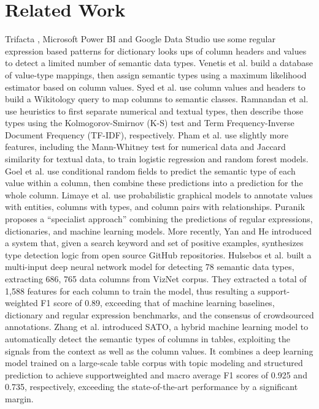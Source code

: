 \documentclass{article}
\begin{document}
\section{Related Work}
Trifacta \cite{Trifacta}, Microsoft Power BI \cite{powerbi} and Google Data Studio \cite{google}  use some regular expression based patterns for dictionary looks ups of column headers and values to detect a limited number of semantic data types. Venetis et al. \cite{Venetis} build a database of value-type mappings, then assign semantic types using a maximum likelihood estimator based on column values. Syed et al. \cite{Syed2010ExploitingAW} use column values and headers to build a Wikitology query to map columns to semantic classes. Ramnandan et al. \cite{Ramnandan} use heuristics to first separate numerical and textual types, then describe those types using the Kolmogorov-Smirnov (K-S) test and Term Frequency-Inverse Document Frequency (TF-IDF), respectively. Pham et al. \cite{Pham} use slightly more features, including the Mann-Whitney test for numerical data and Jaccard similarity for textual data, to train logistic regression and random forest models.  Goel et al. \cite{Goel12k.:exploiting} use conditional random fields to predict the semantic type of each value within a column, then combine these predictions into a prediction for the whole column. Limaye et al. \cite{Limaye} use probabilistic graphical models to annotate values with entities, columns with types, and column pairs with relationships. Puranik \cite{Puranik2012ASA} proposes a “specialist approach” combining the predictions of regular expressions, dictionaries, and machine learning models. More recently, Yan and He \cite{yan} introduced a system that, given a search keyword and set of positive examples, synthesizes type detection logic from open source GitHub repositories. Hulsebos et al. \cite{Hulsebos} built a multi-input deep neural network model for detecting 78 semantic data types, extracting 686, 765 data columns from VizNet \cite{viznet} corpus. They extracted a total of 1,588 features for each column to train the model, thus resulting a support-weighted F1 score of 0.89, exceeding that of machine learning baselines, dictionary and regular expression benchmarks, and the consensus of crowdsourced annotations. Zhang et al. \cite{sato} introduced SATO,  a hybrid machine learning model to automatically detect the semantic types of columns in tables, exploiting the signals from the context as well as the column values. It combines a deep learning model trained on a large-scale table corpus with topic modeling and structured prediction to achieve supportweighted and macro average F1 scores of 0.925 and 0.735, respectively, exceeding the state-of-the-art performance by a significant margin. 
\end{document}
